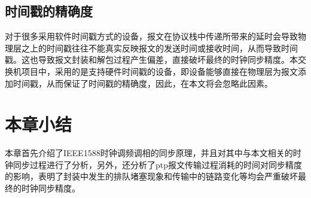 \subsection{时间戳的精确度}
\label{sec:1588_problem_2}
对于很多采用软件时间戳方式的设备，报文在协议栈中传递所带来的延时会导致物理层之上的时间戳往往不能真实反映报文的发送时间或接收时间，从而导致时间戳\supercite{53}。这也导致报文封装和解包过程产生偏差，直接破坏最终的时钟同步精度。本交换机项目中，采用的是支持硬件时间戳的设备，即设备能够直接在物理层为报文添加时间戳，从而保证了时间戳的精确度，因此，在本文将会忽略此因素。

\section{本章小结}
本章首先介绍了IEEE1588时钟调频调相的同步原理，并且对其中与本文相关的时钟同步过程进行了分析，另外，还分析了ptp报文传输过程消耗的时间对同步精度的影响，表明了封装中发生的排队堵塞现象和传输中的链路变化等均会严重破坏最终的时钟同步精度。
